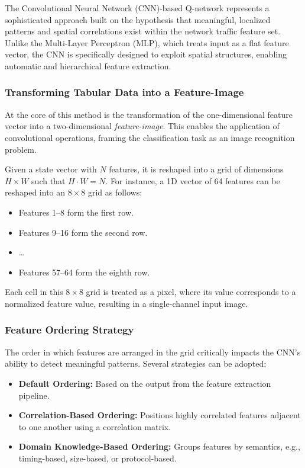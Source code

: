 \documentclass{report}
\begin{document}
The Convolutional Neural Network (CNN)-based Q-network represents a sophisticated approach built on the hypothesis that meaningful, localized patterns and spatial correlations exist within the network traffic feature set. Unlike the Multi-Layer Perceptron (MLP), which treats input as a flat feature vector, the CNN is specifically designed to exploit spatial structures, enabling automatic and hierarchical feature extraction.

\subsubsection*{Transforming Tabular Data into a Feature-Image}

At the core of this method is the transformation of the one-dimensional feature vector into a two-dimensional \textit{feature-image}. This enables the application of convolutional operations, framing the classification task as an image recognition problem.

Given a state vector with $N$ features, it is reshaped into a grid of dimensions $H \times W$ such that $H \cdot W = N$. For instance, a 1D vector of 64 features can be reshaped into an $8 \times 8$ grid as follows:

\begin{itemize}
    \item Features 1--8 form the first row.
    \item Features 9--16 form the second row.
    \item \dots
    \item Features 57--64 form the eighth row.
\end{itemize}

Each cell in this $8 \times 8$ grid is treated as a pixel, where its value corresponds to a normalized feature value, resulting in a single-channel input image.

\subsubsection*{Feature Ordering Strategy}

The order in which features are arranged in the grid critically impacts the CNN’s ability to detect meaningful patterns. Several strategies can be adopted:

\begin{itemize}
    \item \textbf{Default Ordering:} Based on the output from the feature extraction pipeline.
    \item \textbf{Correlation-Based Ordering:} Positions highly correlated features adjacent to one another using a correlation matrix.
    \item \textbf{Domain Knowledge-Based Ordering:} Groups features by semantics, e.g., timing-based, size-based, or protocol-based.
\end{itemize}
\end{document}
